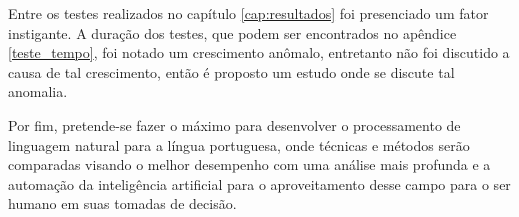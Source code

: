 Entre os testes realizados no capítulo \ref{cap:resultados} foi presenciado um fator instigante. A duração dos testes,  que podem ser encontrados no apêndice \ref{teste_tempo},  foi notado um crescimento anômalo, entretanto não foi discutido a causa de tal crescimento, então é proposto um estudo onde se discute tal anomalia. 

Por fim, pretende-se fazer o máximo para desenvolver o  processamento de linguagem natural para a língua portuguesa, onde técnicas e métodos serão comparadas visando o melhor desempenho com uma análise mais profunda e a automação da inteligência artificial para o aproveitamento desse campo para o ser humano em suas tomadas de decisão. 
